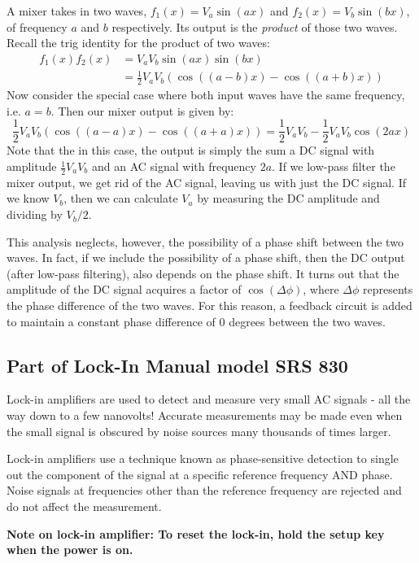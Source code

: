 \documentclass{../lab}
\begin{document}
A mixer takes in two waves, $f_1(x) = V_a\sin(ax)$ and $f_2(x) = V_b\sin(bx)$, of frequency $a$ and $b$ respectively. Its output is the \emph{product} of those two waves. Recall the trig identity for the product of two waves:
\begin{align*}
f_1(x) f_2(x) &= V_a V_b \sin(ax)\sin(bx) \\
&= \frac{1}{2} V_a V_b(\cos((a-b)x) - \cos((a+b)x))
\end{align*}
Now consider the special case where both input waves have the same frequency, i.e. $a = b$. Then our mixer output is given by:
\[
\frac{1}{2} V_a V_b(\cos((a-a)x) - \cos((a+a)x))
    = \frac{1}{2}V_a V_b - \frac{1}{2} V_a V_b \cos(2ax)
\]
Note that the in this case, the output is simply the sum a DC signal with amplitude $\frac{1}{2} V_a V_b$ and an AC signal with frequency $2a$. If we low-pass filter the mixer output, we get rid of the AC signal, leaving us with just the DC signal. If we know $V_b$, then we can calculate $V_a$ by measuring the DC amplitude and dividing by $V_b/2$.

This analysis neglects, however, the possibility of a phase shift between the two waves. In fact, if we include the possibility of a phase shift, then the DC output (after low-pass filtering), also depends on the phase shift. It turns out that the amplitude of the DC signal acquires a factor of $\cos(\Delta \phi)$, where $\Delta \phi$ represents the phase difference of the two waves. For this reason, a feedback circuit is added to maintain a constant phase difference of 0 degrees between the two waves.

\subsection{Part of Lock-In Manual model SRS 830}

Lock-in amplifiers are used to detect and measure very small AC signals - all the way down to a few nanovolts! Accurate measurements may be made even when the small signal is obscured by noise sources many thousands of times larger.

Lock-in amplifiers use a technique known as phase-sensitive detection to single out the component of the signal at a specific reference frequency AND phase. Noise signals at frequencies other than the reference frequency are rejected and do not affect the measurement.

\textbf{Note on lock-in amplifier: To reset the lock-in, hold the setup key when the power is on.}
\end{document}
